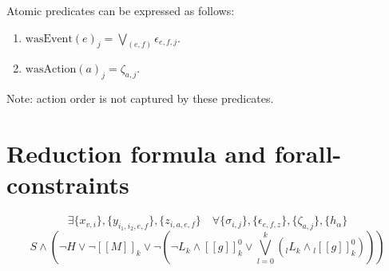 \documentclass[a4paper]{article}
\begin{document}
Atomic predicates can be expressed as follows:
\begin{enumerate}
\item $\mathrm{wasEvent}(e)_j = \bigvee\limits_{(e, f)} \epsilon_{e, f, j}$.
\item $\mathrm{wasAction}(a)_j = \zeta_{a, j}$.
\end{enumerate}

Note: action order is not captured by these predicates.

\section{Reduction formula and forall-constraints}

$$\exists \{x_{v, i}\}, \{y_{i_1, i_2, e, f}\}, \{z_{i, a, e, f}\} \quad \forall \{\sigma_{i, j}\}, \{\epsilon_{e, f, z}\}, \{\zeta_{a, j}\}, \{h_\alpha\}$$
$$S \land \left( \neg H \lor \neg [[M]]_k \lor \neg \left( \neg L_k \land [[g]]_k^0 \lor \bigvee\limits_{l = 0}^k \left( {_l} L_k \land {_l} [[g]]_k^0\right) \right) \right)$$
\end{document}
